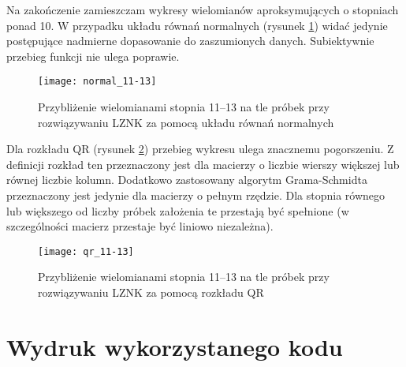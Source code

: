 \documentclass[12pt]{article}
\begin{document}
Na zakończenie zamieszczam wykresy wielomianów aproksymujących o stopniach ponad 10. W przypadku układu równań normalnych (rysunek \ref{fig:normal_11-13}) widać jedynie postępujące nadmierne dopasowanie do zaszumionych danych. Subiektywnie przebieg funkcji nie ulega poprawie.

\begin{figure}[!htbp]
\centering
\texttt{[image: normal\_11-13]}
\centering
\caption{Przybliżenie wielomianami stopnia 11--13 na tle próbek przy rozwiązywaniu LZNK za pomocą układu równań normalnych}
\label{fig:normal_11-13}
\end{figure}
\FloatBarrier

Dla rozkładu QR (rysunek \ref{fig:qr_11-13}) przebieg wykresu ulega znacznemu pogorszeniu. Z definicji rozkład ten przeznaczony jest dla macierzy o liczbie wierszy większej lub równej liczbie kolumn. Dodatkowo zastosowany algorytm Grama-Schmidta przeznaczony jest jedynie dla macierzy o pełnym rzędzie. Dla stopnia równego lub większego od liczby próbek założenia te przestają być spełnione (w szczególności macierz przestaje być liniowo niezależna).

\begin{figure}[!htbp]
\centering
\texttt{[image: qr\_11-13]}
\centering
\caption{Przybliżenie wielomianami stopnia 11--13 na tle próbek przy rozwiązywaniu LZNK za pomocą rozkładu QR}
\label{fig:qr_11-13}
\end{figure}
\FloatBarrier

\clearpage
\section{Wydruk wykorzystanego kodu}
\end{document}
